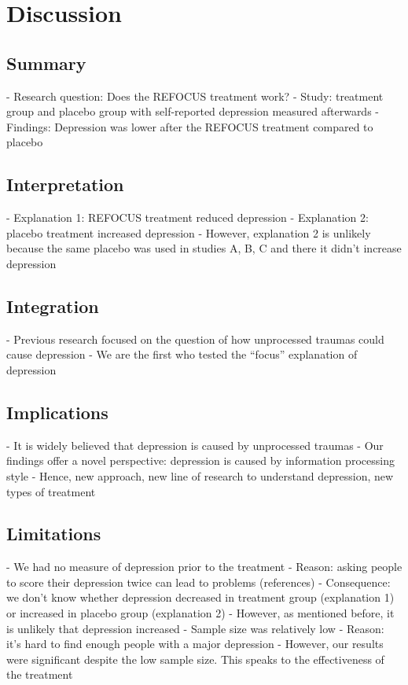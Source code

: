 \chapter{Discussion}

\section{Summary}
\label{summary}

- Research question: Does the REFOCUS treatment work?
- Study: treatment group and placebo group with self-reported depression measured afterwards
- Findings: Depression was lower after the REFOCUS treatment compared to placebo

\section{Interpretation}
\label{interpretation}

- Explanation 1: REFOCUS treatment reduced depression
- Explanation 2: placebo treatment increased depression
- However, explanation 2 is unlikely because the same placebo was used in studies
A, B, C and there it didn’t increase depression

\section{Integration}
\label{integration}

- Previous research focused on the question of how unprocessed traumas could cause
depression
- We are the first who tested the “focus” explanation of depression

\section{Implications}
\label{implications}

- It is widely believed that depression is caused by unprocessed traumas
- Our findings offer a novel perspective: depression is caused by information
processing style
- Hence, new approach, new line of research to understand depression, new types of
treatment

\section{Limitations}
\label{limitations}

- We had no measure of depression prior to the treatment
- Reason: asking people to score their depression twice can lead to problems
(references)
- Consequence: we don’t know whether depression decreased in treatment
group (explanation 1) or increased in placebo group (explanation 2)
- However, as mentioned before, it is unlikely that depression increased
- Sample size was relatively low
- Reason: it’s hard to find enough people with a major depression
- However, our results were significant despite the low sample size. This speaks
to the effectiveness of the treatment